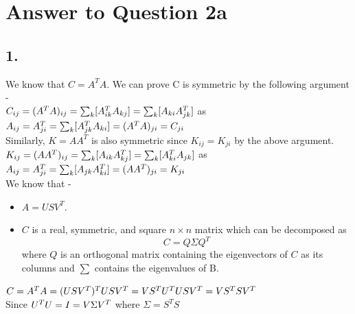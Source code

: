 \documentclass[11pt]{article}
\begin{document}
{\pagebreak[4]
\section*{Answer to Question 2a}

\subsection*{1.}
We know that $C =A^TA$. We can prove C is symmetric by the following argument - \\

$C_{ij} = (A^T  A)_{ij} \\
= \sum_k [ A^T_{ik}  A_{kj} ] \\
= \sum_k [ A_{ki}  A^T_{jk} ]$ as $A_{ij} = A^T_{ji} \\
= \sum_k [ A^T_{jk}  A_{ki} ] \\
= (A^T  A)_{ji}\\
= C_{ji}$ \\

Similarly, $K = AA^T$ is also symmetric since $K_{ij} = K_{ji}$ by the above argument.\\

$K_{ij} = (A  A^T)_{ij} \\
= \sum_k [ A_{ik}  A^T_{kj} ] \\
= \sum_k [ A^T_{ki}  A_{jk} ]$ as $A_{ij} = A^T_{ji} \\
= \sum_k [ A_{jk}  A^T_{ki} ] \\
= (A  A^T)_{ji}\\
= K_{ji}$ \\

We know that -
\begin{itemize}
\item $A = USV^T$.
\item $C$ is a real, symmetric, and square $n \times n$ matrix which can be decomposed as 
\begin{equation}
C=Q \Sigma Q^T
\end{equation}	
where  $Q$ is an orthogonal matrix containing the eigenvectors of $C$ as its columns and $\sum$ contains the eigenvalues of B.\\
\end{itemize} 
$C = A^T A = (USV^T)^TUSV^T \\
= V S^T U^T U S V^T  \\
= V S^T S V^T  \hspace{30 mm}$ Since $U^T U = I\\
= V \Sigma V^T$ \hspace{30 mm} where $\Sigma = S^T S$\\

}
\end{document}

